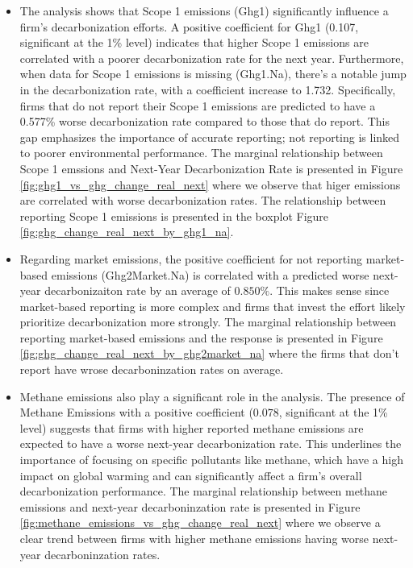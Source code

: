 \begin{itemize}
    \item The analysis shows that Scope 1 emissions (Ghg1) significantly influence a firm's decarbonization efforts. A positive coefficient for Ghg1 (0.107, significant at the 1\% level) indicates that higher Scope 1 emissions are correlated with a poorer decarbonization rate for the next year. Furthermore, when data for Scope 1 emissions is missing (Ghg1.Na), there's a notable jump in the decarbonization rate, with a coefficient increase to 1.732. Specifically, firms that do not report their Scope 1 emissions are predicted to have a 0.577\% worse decarbonization rate compared to those that do report. This gap emphasizes the importance of accurate reporting; not reporting is linked to poorer environmental performance. The marginal relationship between Scope 1 emssions and Next-Year Decarbonization Rate is presented in Figure \ref{fig:ghg1_vs_ghg_change_real_next} where we observe that higer emissions are correlated with worse decarbonization rates. The relationship between reporting Scope 1 emissions is presented in the boxplot Figure \ref{fig:ghg_change_real_next_by_ghg1_na}.

    \item Regarding market emissions, the positive coefficient for not reporting market-based emissions (Ghg2Market.Na) is correlated with a predicted worse next-year decarbonizaiton rate by an average of $0.850 \%$. This makes sense since market-based reporting is more complex and firms that invest the effort likely prioritize decarbonization more strongly. The marginal relationship between reporting market-based emissions and the response is presented in Figure \ref{fig:ghg_change_real_next_by_ghg2market_na} where the firms that don't report have wrose decarboninzation rates on average.
    
    \item Methane emissions also play a significant role in the analysis. The presence of Methane Emissions with a positive coefficient ($0.078$, significant at the 1\% level) suggests that firms with higher reported methane emissions are expected to have a worse next-year decarbonization rate. This underlines the importance of focusing on specific pollutants like methane, which have a high impact on global warming and can significantly affect a firm's overall decarbonization performance. The marginal relationship between methane emissions and next-year decarboninzation rate is presented in Figure \ref{fig:methane_emissions_vs_ghg_change_real_next} where we observe a clear trend between firms with higher methane emissions having worse next-year decarboninzation rates.
    


\end{itemize}
